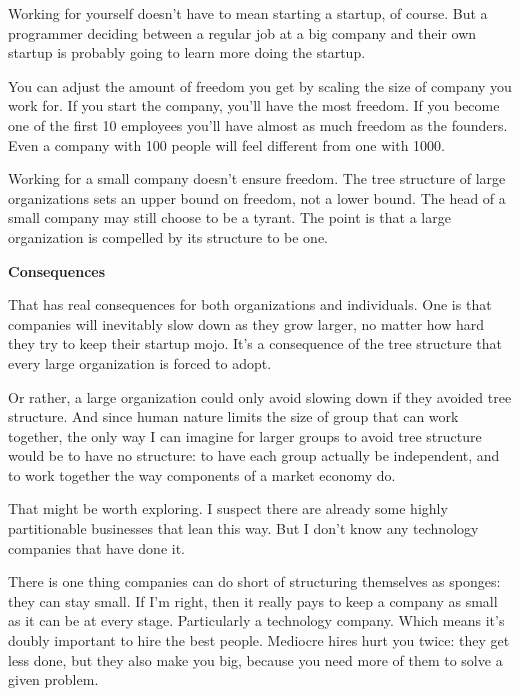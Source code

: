 Working
                    for yourself doesn't have to mean starting a startup, of
                    course. But a programmer deciding between a regular job at a
                    big company and their own startup is probably going to learn
                    more doing the startup.

You can adjust the amount
                    of freedom you get by scaling the size of company you work
                    for. If you start the company, you'll have the most freedom.
                    If you become one of the first 10 employees you'll have
                    almost as much freedom as the founders. Even a company with
                    100 people will feel different from one with 1000.

Working
                    for a small company doesn't ensure freedom. The tree
                    structure of large organizations sets an upper bound on
                    freedom, not a lower bound. The head of a small company may
                    still choose to be a tyrant. The point is that a large
                    organization is compelled by its structure to be one.


                    \textbf{Consequences}

That has real consequences
                    for both organizations and individuals. One is that
                    companies will inevitably slow down as they grow larger, no
                    matter how hard they try to keep their startup mojo. It's a
                    consequence of the tree structure that every large
                    organization is forced to adopt.

Or rather, a
                    large organization could only avoid slowing down if they
                    avoided tree structure. And since human nature limits the
                    size of group that can work together, the only way I can
                    imagine for larger groups to avoid tree structure would be
                    to have no structure: to have each group actually be
                    independent, and to work together the way components of a
                    market economy do.

That might be worth exploring.
                    I suspect there are already some highly partitionable
                    businesses that lean this way. But I don't know any
                    technology companies that have done it.

There is
                    one thing companies can do short of structuring themselves
                    as sponges: they can stay small. If I'm right, then it
                    really pays to keep a company as small as it can be at every
                    stage. Particularly a technology company. Which means it's
                    doubly important to hire the best people. Mediocre hires
                    hurt you twice: they get less done, but they also make you
                    big, because you need more of them to solve a given
                    problem.

